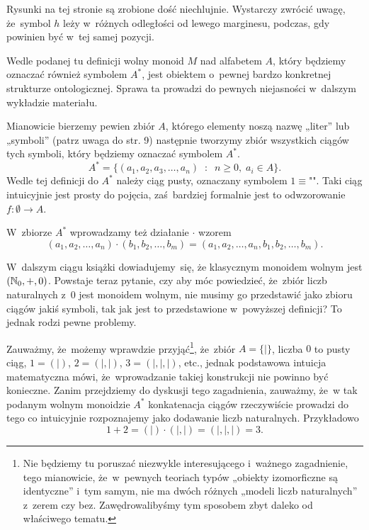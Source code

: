 \documentclass[a4paper,11pt]{article}
\begin{document}
\vspace{\spaceFour}



\start {} Rysunki na tej stronie są zrobione dość niechlujnie.
Wystarczy zwrócić uwagę, że~symbol $h$ leży w~różnych odległości od
lewego marginesu, podczas, gdy powinien być w~tej samej pozycji.

\vspace{\spaceFour}



\start {} Wedle podanej tu definicji wolny monoid $M$ nad
alfabetem $A$, który będziemy oznaczać również symbolem $A^{ * }$,
jest obiektem o~pewnej bardzo konkretnej strukturze ontologicznej.
Sprawa ta prowadzi do pewnych niejasności w~dalszym wykładzie
materiału.

Mianowicie bierzemy pewien zbiór $A$, którego elementy noszą nazwę
„liter” lub „symboli” (patrz uwaga do str. 9) następnie tworzymy zbiór
wszystkich ciągów tych symboli, który będziemy oznaczać symbolem
$A^{ * }$.
\begin{equation}
  \label{eq:Forys-Forys-02}
  A^{ * } =
  \{ ( a_{ 1 }, a_{ 2 }, a_{ 3 }, \ldots, a_{ n } ) \;\; : \;\; n \geq 0, \;
  a_{ i } \in A \}.
\end{equation}
Wedle tej definicji do $A^{ * }$ należy ciąg pusty, oznaczany symbolem
$1 \equiv \textrm{""}$. Taki ciąg intuicyjnie jest prosty do pojęcia,
zaś~bardziej formalnie jest to odwzorowanie $f : \emptyset \to A$.

W~zbiorze $A^{ * }$ wprowadzamy też działanie $\cdot$ wzorem
\begin{equation}
  \label{eq:Froys-Forys-03}
  ( a_{ 1 }, a_{ 2 }, \ldots, a_{ n } ) \cdot ( b_{ 1 }, b_{ 2 }, \ldots, b_{ m } ) =
  ( a_{ 1 }, a_{ 2 }, \ldots, a_{ n }, b_{ 1 }, b_{ 2 }, \ldots, b_{ m } ).
\end{equation}

W~dalszym ciągu książki dowiadujemy~się, że klasycznym monoidem wolnym
jest $( \mathbb{N}_{ 0 }, +, 0 )$. Powstaje teraz pytanie, czy aby móc
powiedzieć, że~zbiór liczb naturalnych z~$0$ jest monoidem wolnym, nie
musimy go przedstawić jako zbioru ciągów jakiś symboli, tak jak jest
to przedstawione w~powyższej definicji? To jednak rodzi pewne
problemy.

Zauważmy, że~możemy wprawdzie przyjąć\footnote{Nie będziemy tu
  poruszać niezwykle interesującego i~ważnego zagadnienie, tego
  mianowicie, że~w~pewnych teoriach typów „obiekty izomorficzne są
  identyczne” i~tym samym, nie ma dwóch różnych „modeli liczb
  naturalnych” z~zerem czy bez. Zawędrowalibyśmy tym sposobem zbyt
  daleko od właściwego tematu.}, że~zbiór $A = \{ | \}$, liczba $0$ to
pusty ciąg, $1 = ( | )$, $2 = ( |, | )$, $3 = ( |, |, | )$, etc.,
jednak podstawowa intuicja matematyczna mówi, że~wprowadzanie takiej
konstrukcji nie powinno być konieczne. Zanim przejdziemy do dyskusji
tego zagadnienia, zauważmy, że~w tak podanym wolnym monoidzie
$A^{ * }$ konkatenacja ciągów rzeczywiście prowadzi do tego co
intuicyjnie rozpoznajemy jako dodawanie liczb naturalnych. Przykładowo
\begin{equation}
  \label{eq:Forys-Forys-04}
  1 + 2 = ( | ) \cdot ( |, | ) = ( |, |, | ) = 3.
\end{equation}
\end{document}
